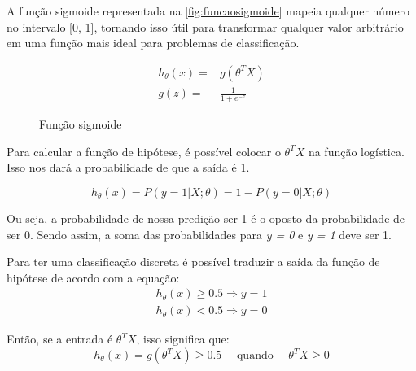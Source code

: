 A função sigmoide representada na \autoref{fig:funcaosigmoide} mapeia qualquer número no intervalo [0, 1], tornando isso útil para transformar qualquer valor arbitrário em uma função mais ideal para problemas de classificação.

\begin{align}
h_{\theta}(x) = & g(\theta^TX) \nonumber \\
g(z) = & \frac{1}{1 + e^{-z}} \label{eq:funcaosigmoide}
\end{align}

\begin{figure}[!htb]
  \caption{Função sigmoide} \label{fig:funcaosigmoide}
  \begin{center}
  \end{center}
\end{figure}



Para calcular a função de hipótese, é possível colocar o $\theta^TX$ na função logística. Isso nos dará a probabilidade de que a saída é 1.

\begin{equation}
h_{\theta}(x) = P(y=1 | X ; \theta) = 1 - P(y=0 | X ; \theta) \nonumber
\end{equation}

Ou seja, a probabilidade de nossa predição ser 1 é o oposto da probabilidade de ser 0. Sendo assim, a soma das probabilidades para \textit{y = 0} e \textit{y = 1} deve ser 1.

Para ter uma classificação discreta é possível traduzir a saída da função de hipótese de acordo com a equação:
\begin{align} 
h_{\theta}(x) \geq 0.5 \Rightarrow y = 1 \nonumber \\
h_{\theta}(x) < 0.5 \Rightarrow y = 0 \nonumber
\end{align}

Então, se a entrada é $\theta^TX$, isso significa que:
\begin{equation}
h_{\theta}(x) = g(\theta^TX) \geq 0.5 \quad \text{ quando } \quad \theta^TX \geq 0 \nonumber
\end{equation}

